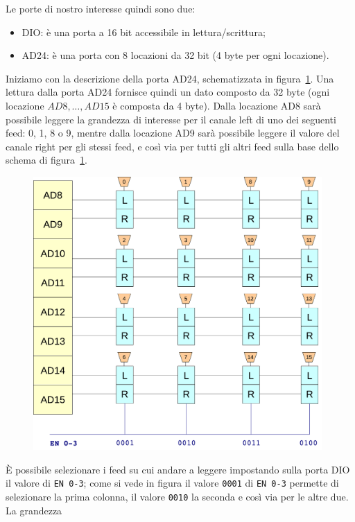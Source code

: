 Le porte di nostro interesse quindi sono due:
\begin{itemize}
\item DIO: \`e una porta a 16 bit accessibile in lettura/scrittura;
\item AD24: \`e una porta con 8 locazioni da 32 bit (4 byte per ogni locazione).
\end{itemize}
Iniziamo con la descrizione della porta AD24, schematizzata in figura~\ref{fig:AD24}.
Una lettura dalla porta AD24 fornisce quindi un dato composto da 32 byte (ogni locazione $AD8, \dots, AD15$
\`e composta da 4 byte). Dalla locazione AD8 sar\`a possibile leggere la grandezza di interesse per il 
canale left di uno dei seguenti feed: 0, 1, 8 o 9, mentre dalla locazione AD9 sar\`a possibile leggere
il valore del canale right per gli stessi feed, e cos\`i via per tutti gli altri feed sulla base dello schema
di figura~\ref{fig:AD24}. 
\begin{center}
\begin{figure}[!htbp]
        \begin{center}
        \includegraphics[width=11cm]{figure/AD24}
        \end{center}
         \label{fig:AD24}
\end{figure}
\end{center}
\`E possibile selezionare i feed su cui andare a leggere impostando sulla porta
DIO il valore di \texttt{EN 0-3}; come si vede in figura il valore \texttt{0001} di \texttt{EN 0-3} permette
di selezionare la prima colonna, il valore \texttt{0010} la seconda e cos\`i via per le altre due. La grandezza
